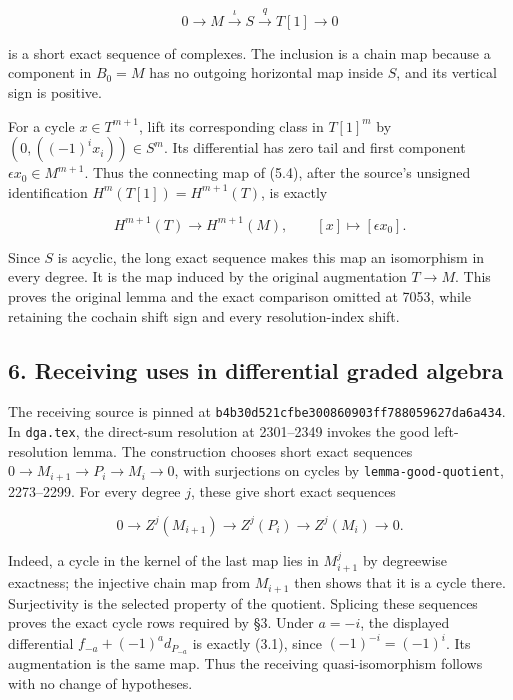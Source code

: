 \documentclass[11pt]{article}
\begin{document}
\[
0\longrightarrow M\xrightarrow{\iota}S\xrightarrow{q}T[1]
\longrightarrow0                                      \tag{5.4}
\]

is a short exact sequence of complexes. The inclusion is a chain map because a component in \(B_0=M\) has no outgoing horizontal map inside \(S\), and its vertical sign is positive.

For a cycle \(x\in T^{m+1}\), lift its corresponding class in \(T[1]^m\) by \((0,((-1)^ix_i))\in S^m\). Its differential has zero tail and first component \(\epsilon x_0\in M^{m+1}\). Thus the connecting map of (5.4), after the source's unsigned identification \(H^m(T[1])=H^{m+1}(T)\), is exactly

\[
H^{m+1}(T)\longrightarrow H^{m+1}(M),\qquad
[x]\longmapsto[\epsilon x_0].
\]

Since \(S\) is acyclic, the long exact sequence makes this map an isomorphism in every degree. It is the map induced by the original augmentation \(T\to M\). This proves the original lemma and the exact comparison omitted at 7053, while retaining the cochain shift sign and every resolution-index shift.

\subsection{6. Receiving uses in differential graded algebra}\label{note-08-receiving-uses-in-differential-graded-algebra}

The receiving source is pinned at \texttt{b4b30d52\allowbreak{}1cfbe300\allowbreak{}860903ff\allowbreak{}78805962\allowbreak{}7da6a434}. In \texttt{dga.tex}, the direct-sum resolution at 2301--2349 invokes the good left-resolution lemma. The construction chooses short exact sequences \(0\to M_{i+1}\to P_i\to M_i\to0\), with surjections on cycles by \texttt{lemma-good-quotient}, 2273--2299. For every degree \(j\), these give short exact sequences

\[
0\to Z^j(M_{i+1})\to Z^j(P_i)\to Z^j(M_i)\to0.
\]

Indeed, a cycle in the kernel of the last map lies in \(M_{i+1}^j\) by degreewise exactness; the injective chain map from \(M_{i+1}\) then shows that it is a cycle there. Surjectivity is the selected property of the quotient. Splicing these sequences proves the exact cycle rows required by §3. Under \(a=-i\), the displayed differential \(f_{-a}+(-1)^a d_{P_{-a}}\) is exactly (3.1), since \((-1)^{-i}=(-1)^i\). Its augmentation is the same map. Thus the receiving quasi-isomorphism follows with no change of hypotheses.
\end{document}
